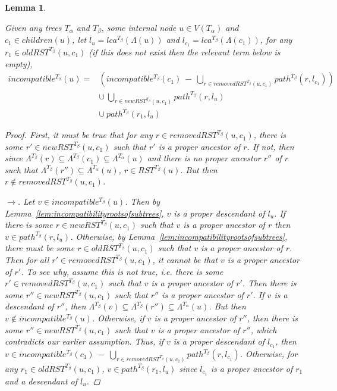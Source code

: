 \documentclass{article}
\newcommand{\leafset}{\Lambda}
\newcommand{\TA}{T_\alpha}
\newcommand{\TB}{T_\beta}
\newtheorem{incompatibilityrecursive}[incompatibility]{Lemma}
\begin{document}
    \begin{incompatibilityrecursive}
        \label{lem:incompatibilityrecursive}

        Given any trees $\TA$ and $\TB$, some internal node $u \in V(\TA)$ and $c_1 \in children(u)$, let $l_u = lca^{\TB}(\leafset(u))$ and $l_{c_1} = lca^{\TB}(\leafset(c_1))$, for any $r_1 \in oldRST^{\TB}(u, c_1)$ (if this does not exist then the relevant term below is empty),
        \begin{align*}
            incompatible^{\TB}(u) = &\left(incompatible^{\TB}(c_1)\ -\ \bigcup_{r \in removedRST^{\TB}(u, c_1)} path^{\TB}(r, l_{c_1})\right)\\
            &\cup\ \bigcup_{r \in newRST^{\TB}(u, c_1)} path^{\TB}(r, l_u)\\
            &\cup\ path^{\TB}(r_1, l_u)
        \end{align*}

        \begin{proof}
            First, it must be true that for any $r \in removedRST^{\TB}(u, c_1)$, there is some $r' \in newRST^{\TB}(u, c_1)$ such that $r'$ is a proper ancestor of $r$. If not, then since $\leafset^{\TB}(r) \subseteq \leafset^{\TB}(c_1) \subseteq \leafset^{\TA}(u)$ and there is no proper ancestor $r''$ of $r$ such that $\leafset^{\TB}(r'') \subseteq \leafset^{\TA}(u)$, $r \in RST^{\TB}(u)$. But then $r \not\in removedRST^{\TB}(u, c_1)$.

            $\longrightarrow$. Let $v \in incompatible^{\TB}(u)$. Then by Lemma~\ref{lem:incompatibilityrootsofsubtrees}, $v$ is a proper descendant of $l_u$. If there is some $r \in newRST^{\TB}(u, c_1)$ such that $v$ is a proper ancestor of $r$ then $v \in path^{\TB}(r, l_u)$. Otherwise, by Lemma~\ref{lem:incompatibilityrootsofsubtrees}, there must be some $r \in oldRST^{\TB}(u, c_1)$ such that $v$ is a proper ancestor of $r$. Then for all $r' \in removedRST^{\TB}(u, c_1)$, it cannot be that $v$ is a proper ancestor of $r'$. To see why, assume this is not true, i.e. there is some $r' \in removedRST^{\TB}(u, c_1)$ such that $v$ is a proper ancestor of $r'$. Then there is some $r'' \in newRST^{\TB}(u, c_1)$ such that $r''$ is a proper ancestor of $r'$. If $v$ is a descendant of $r''$, then $\leafset^{\TB}(v) \subseteq \leafset^{\TB}(r'') \subseteq \leafset^{\TA}(u)$. But then $v \not\in incompatible^{\TB}(u)$. Otherwise, if $v$ is a proper ancestor of $r''$, then there is some $r'' \in newRST^{\TB}(u, c_1)$ such that $v$ is a proper ancestor of $r''$, which contradicts our earlier assumption. Thus, if $v$ is a proper descendant of $l_{c_1}$, then $v \in incompatible^{\TB}(c_1)\ -\ \bigcup_{r \in removedRST^{\TB}(u, c_1)} path^{\TB}(r, l_{c_1})$. Otherwise, for any $r_1 \in oldRST^{\TB}(u, c_1)$, $v \in path^{\TB}(r_1, l_u)$ since $l_{c_1}$ is a proper ancestor of $r_1$ and a descendant of $l_u$.


\end{proof}
\end{incompatibilityrecursive}
\end{document}
